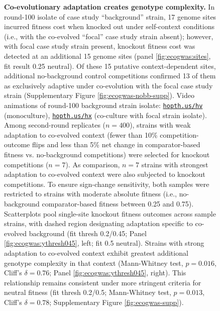 \begin{figure}
\caption{%
\textbf{Co-evolutionary adaptation creates genotype complexity.}
\footnotesize
In round-100 isolate of case study ``background'' strain, 17 genome sites incurred fitness cost when knocked out under self-context conditions (i.e., with the co-evolved ``focal'' case study strain absent);
however, with focal case study strain present, knockout fitness cost was detected at an additional 15 genome sites (panel \ref{fig:ecogwas:sites}, fit result 0.25 neutral).
Of these 15 putative context-dependent sites, additional no-background control competitions confirmed 13 of them as exclusively adaptive under co-evolution with the focal case study strain (Supplementary Figure \ref{fig:ecogwas-nobb-supp}).
Video animations of round-100 background strain isolate: \href{https://hopth.us/hv}{\texttt{hopth.us/hv}} (monoculture), \href{https://hopth.us/hx}{\texttt{hopth.us/hx}} (co-culture with focal strain isolate).
Among second-round replicates ($n=400$), strains with weak adaptation to co-evolved context (fewer than 10\% competition-outcome flips and less than 5\% net change in comparator-based fitness vs. no-background competitions) were selected for knockout competitions ($n=7$).
As comparison, $n=7$ strains with strongest adaptation to co-evolved context were also subjected to knockout competitions.
To ensure sign-change sensitivity, both samples were restricted to strains with moderate absolute fitness (i.e., no-background comparator-based fitness between 0.25 and 0.75).
Scatterplots pool single-site knockout fitness outcomes across sample strains, with dashed region designating adaptation specific to co-evolved background (fit thresh 0.2/0.45; Panel \ref{fig:ecogwas:ythresh045}, left; fit 0.5 neutral).
Strains with strong adaptation to co-evolved context exhibit greatest additional genotype complexity in that context (Mann-Whitney test, $p=0.016$, Cliff's $\delta=0.76$; Panel \ref{fig:ecogwas:ythresh045}, right).
This relationship remains consistent under more stringent criteria for neutral fitness (fit thresh 0.2/0.5; Mann-Whitney test, $p=0.013$, Cliff's $\delta=0.78$; Supplementary Figure \ref{fig:ecogwas-supp}).
}
\label{fig:ecogwas}
\end{figure}
